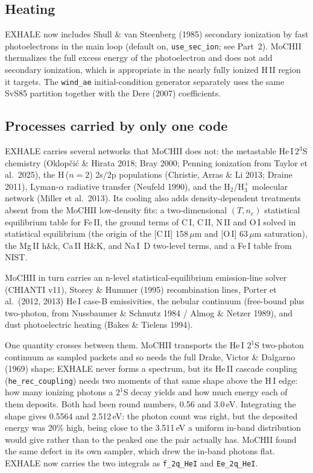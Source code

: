 \documentclass[english,a4paper]{my_memo}
\newcommand{\code}[1]{\texttt{#1}}
\begin{document}
\subsection{Heating}
EXHALE now includes Shull \& van Steenberg (1985) secondary ionization by
fast photoelectrons in the main loop (default on, \code{use\_sec\_ion}; see
Part~2). MoCHII thermalizes the full excess energy of the photoelectron and
does not add secondary ionization, which is appropriate in the nearly fully
ionized H\,II region it targets. The \code{wind\_ae} initial-condition
generator separately uses the same SvS85 partition together with the Dere
(2007) coefficients.

\subsection{Processes carried by only one code}\label{sec:unique}
EXHALE carries several networks that MoCHII does not: the metastable
He\,I\,$2^3$S chemistry (Oklop\v{c}i\'c \& Hirata 2018; Bray 2000; Penning
ionization from Taylor et al.\ 2025), the H\,($n{=}2$) 2s/2p populations
(Christie, Arras \& Li 2013; Draine 2011), Lyman-$\alpha$ radiative
transfer (Neufeld 1990), and the H$_2$/H$_3^+$ molecular network (Miller
et al.\ 2013). Its cooling also adds density-dependent treatments absent
from the MoCHII low-density fits: a two-dimensional $(T,n_e)$ statistical
equilibrium table for Fe\,II, the ground terms of C\,I, C\,II, N\,II and O\,I
solved in statistical equilibrium (the origin of the [C\,II] 158\,$\mu$m and
[O\,I] 63\,$\mu$m saturation), the Mg\,II h\&k, Ca\,II H\&K, and Na\,I~D two-level
terms, and a Fe\,I table from NIST.

MoCHII in turn carries an n-level statistical-equilibrium emission-line
solver (CHIANTI v11), Storey \& Hummer (1995) recombination lines, Porter
et al.\ (2012, 2013) He\,I case-B emissivities, the nebular continuum
(free-bound plus two-photon, from Nussbaumer \& Schmutz 1984 / Almog \&
Netzer 1989), and dust photoelectric heating (Bakes \& Tielens 1994).

One quantity crosses between them. MoCHII transports the He\,I $2^1$S
two-photon continuum as sampled packets and so needs the full Drake, Victor
\& Dalgarno (1969) shape; EXHALE never forms a spectrum, but its He\,II
cascade coupling (\texttt{he\_rec\_coupling}) needs two moments of that same
shape above the H\,I edge: how many ionizing photons a $2^1$S decay yields
and how much energy each of them deposits. Both had been round numbers, 0.56
and 3.0\,eV. Integrating the shape gives 0.5564 and 2.512\,eV: the photon
count was right, but the deposited energy was 20\% high, being close to the
3.511\,eV a uniform in-band distribution would give rather than to the peaked
one the pair actually has. MoCHII found the same defect in its own sampler,
which drew the in-band photons flat. EXHALE now carries the two integrals as
\texttt{f\_2q\_HeI} and \texttt{Ee\_2q\_HeI}.
\end{document}
